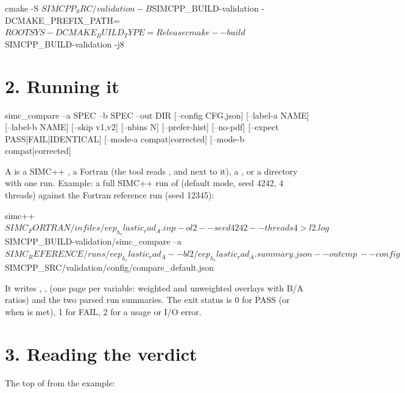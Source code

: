 \begin{simcshell}[basicstyle=\ttfamily\tiny]
cmake -S $SIMCPP_SRC/validation -B $SIMCPP_BUILD-validation -DCMAKE_PREFIX_PATH=$ROOTSYS -DCMAKE_BUILD_TYPE=Release
cmake --build $SIMCPP_BUILD-validation -j8
\end{simcshell}
\section*{\texorpdfstring{2. Running it}{2. Running it}}\label{translation_report-useru5fcomparingu5fwithu5ffortran:2-running-it}
\begin{simcplain}[basicstyle=\ttfamily\scriptsize]
simc_compare --a SPEC --b SPEC --out DIR [--config CFG.json] [--label-a NAME] [--label-b NAME]
             [--skip v1,v2] [--nbins N] [--prefer-hist] [--no-pdf] [--expect PASS|FAIL|IDENTICAL]
             [--mode-a compat|corrected] [--mode-b compat|corrected]
\end{simcplain}
A  is a SIMC++ , a Fortran  (the tool reads ,  and  next to
it), a , or a directory with one run. Example: a full SIMC++ run of  (default mode,
seed 4242, 4 threads) against the Fortran reference run (seed 12345):

\begin{simcshell}[basicstyle=\ttfamily\tiny]
simc++ $SIMC_FORTRAN/infiles/eep_h_elastic_rad_A.inp -o l2 --seed 4242 --threads 4 > l2.log
$SIMCPP_BUILD-validation/simc_compare --a $SIMC_REFERENCE/runs/eep_h_elastic_rad_A --b l2/eep_h_elastic_rad_A.summary.json --out cmp \
                       --config $SIMCPP_SRC/validation/config/compare_default.json
\end{simcshell}
It writes , ,  (one page per variable: weighted and unweighted
overlays with B/A ratios) and the two parsed run summaries. The exit status is 0 for PASS (or when \code{-{}-{}expect} is met),
1 for FAIL, 2 for a usage or I/O error.

\section*{\texorpdfstring{3. Reading the verdict}{3. Reading the verdict}}\label{translation_report-useru5fcomparingu5fwithu5ffortran:3-reading-the-verdict}
The top of \code{summary.\allowbreak{}txt} from the example:

